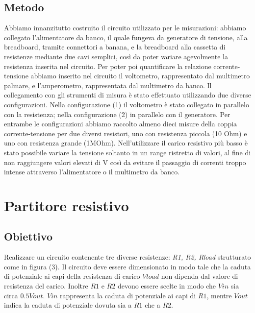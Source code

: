 \documentclass[a4paper]{article}
\begin{document}
\subsection{Metodo}
Abbiamo innanzitutto costruito il circuito utilizzato per le misurazioni: abbiamo collegato l'alimentatore da banco, il quale fungeva da generatore di tensione, alla breadboard, tramite connettori a banana,
e la breadboard alla cassetta di resistenze mediante due cavi semplici, così da poter variare agevolmente la resistenza inserita nel circuito.
Per poter poi quantificare la relazione corrente-tensione abbiamo inserito nel circuito il voltometro, rappresentato dal multimetro palmare, e l'amperometro, rappresentata dal multimetro da banco.
Il collegamento con gli strumenti di misura è stato effettuato utilizzando due diverse configurazioni. Nella configurazione (1) il voltometro è stato collegato in parallelo con la resistenza;
nella configurazione (2) in parallelo con il generatore.
Per entrambe le configurazioni abbiamo raccolto almeno dieci misure della coppia corrente-tensione per due diversi resistori, uno con resistenza piccola (10 Ohm) e uno con resistenza grande (1MOhm).
Nell'utilizzare il carico resistivo più basso è stato possibile variare la tensione soltanto in un range ristretto di valori,
al fine di non raggiungere valori elevati di V così da evitare il passaggio di correnti troppo intense attraverso l'alimentatore o il multimetro da banco.

\section{Partitore resistivo}
\subsection{Obiettivo}
Realizzare un circuito contenente tre diverse resistenze: \emph{R1, R2, Rload} strutturato come in figura (3).
Il circuito deve essere dimensionato in modo tale che la caduta di potenziale ai capi della resistenza di carico \( \mathit{Vload} \) non dipenda dal valore di resistenza del carico.
Inoltre \( \mathit{R1} \) e \( \mathit{R2} \) devono essere scelte in modo che \( \mathit{Vin} \) sia circa \( \mathit{0.5 Vout} \).
\( \mathit{Vin} \) rappresenta la caduta di potenziale ai capi di \( \mathit{R1} \), mentre \( \mathit{Vout} \)indica la caduta di potenziale dovuta sia a \( \mathit{R1} \) che a \( \mathit{R2} \).
\end{document}
